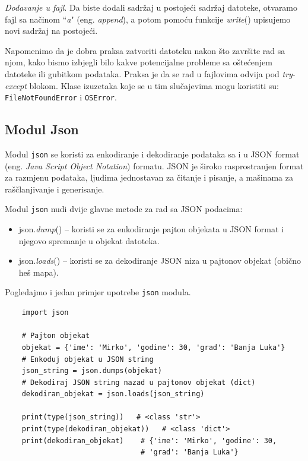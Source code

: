 \textit{Dodavanje u fajl}. Da biste dodali sadržaj u postojeći sadržaj datoteke, otvaramo fajl sa načinom ``\textit{a}" (eng. \textit{append}), a potom pomoću funkcije \textit{write}() upisujemo novi sadržaj na postojeći. 

Napomenimo da je dobra praksa zatvoriti datoteku nakon što završite rad sa njom, kako bismo izbjegli bilo kakve potencijalne probleme sa oštećenjem datoteke ili gubitkom podataka. Praksa je da se rad u fajlovima odvija pod \textit{try}-\textit{except} blokom. Klase izuzetaka koje se u tim slučajevima mogu koristiti su: \texttt{FileNotFoundError} i \texttt{OSError}. 


\subsection{Modul Json}

Modul \texttt{json} se koristi  za enkodiranje i dekodiranje podataka sa i u JSON format (eng. \textit{Java Script Object Notation}) formatu. JSON je  široko rasprostranjen format za razmjenu podataka, ljudima jednostavan za čitanje i pisanje, a mašinama za raščlanjivanje i generisanje.

Modul \texttt{json} nudi dvije glavne metode za rad sa JSON podacima:


\begin{itemize}
	\item json.\textit{dump}() -- koristi se za enkodiranje pajton objekata u JSON format i njegovo spremanje u objekat  datoteka.
	\item json.\textit{loads}() -- koristi se za dekodiranje JSON niza u pajtonov objekat (obično heš mapa).
\end{itemize}

Pogledajmo i jedan primjer upotrebe \texttt{json} modula. 

\begin{verbatim}
	import json
	
	# Pajton objekat
	objekat = {'ime': 'Mirko', 'godine': 30, 'grad': 'Banja Luka'}
	# Enkoduj objekat u JSON string
	json_string = json.dumps(objekat)
	# Dekodiraj JSON string nazad u pajtonov objekat (dict)
	dekodiran_objekat = json.loads(json_string)
	
	print(type(json_string))   # <class 'str'>
	print(type(dekodiran_objekat))   # <class 'dict'>
	print(dekodiran_objekat)    # {'ime': 'Mirko', 'godine': 30,
		                        # 'grad': 'Banja Luka'}
\end{verbatim}


